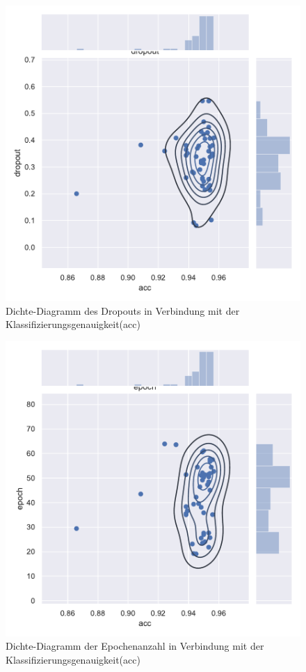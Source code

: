 \begin{figure}[H]
  \centering  
  \includegraphics[scale=0.5]{anhang/GA_250_mnist_digits_True_small_jointplot_dropout.pdf}
  \caption{Dichte-Diagramm des Dropouts in Verbindung mit der Klassifizierungsgenauigkeit(acc)}
  
\end{figure}

\begin{figure}[H]
  \centering  
  \includegraphics[scale=0.5]{anhang/GA_250_mnist_digits_True_small_jointplot_epoch.pdf}
  \caption{Dichte-Diagramm der Epochenanzahl in Verbindung mit der Klassifizierungsgenauigkeit(acc)}
  
\end{figure}


